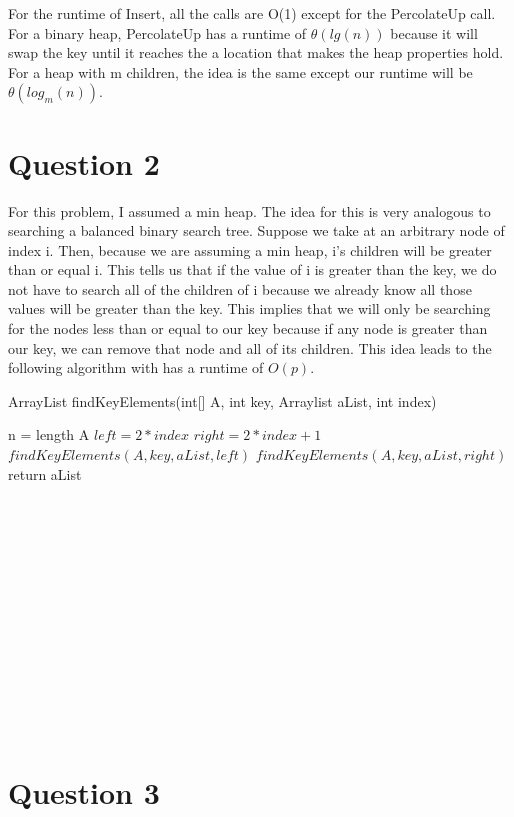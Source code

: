 \documentclass[12pt]{article}
\begin{document}
For the runtime of Insert, all the calls are O(1) except for the PercolateUp call. For a binary heap, PercolateUp has a runtime of $\theta(lg(n))$ because it will swap the key until it reaches the a location that makes the heap properties hold. For a heap with m children, the idea is the same except our runtime will be $\theta(log_m(n))$.

\section{Question 2}

For this problem, I assumed a min heap. The idea for this is very analogous to searching a balanced binary search tree. Suppose we take at an arbitrary node of index i. Then, because we are assuming a min heap, i's children will be greater than or equal i. This tells us that if the value of i is greater than the key, we do not have to search all of the children of i because we already know all those values will be greater than the key. This implies that we will only be searching for the nodes less than or equal to our key because if any node is greater than our key, we can remove that node and all of its children. This idea leads to the following algorithm with has a runtime of $O(p)$.  \\
 \begin{algorithm}
\caption{ArrayList findKeyElements(int[] A, int key, Arraylist aList, int index)}
\begin{algorithmic} 
\STATE n = length A
\STATE $left = 2*index$
\STATE $right = 2*index + 1$
\STATE $findKeyElements(A, key, aList, left)$
\STATE $findKeyElements(A, key, aList, right)$
\ENDIF
\STATE return aList

\end{algorithmic}
\end{algorithm}
\\ \\ \\ \\ \\ \\ \\ \\ \\ \\ \\ \\
\section{Question 3}
\end{document}
